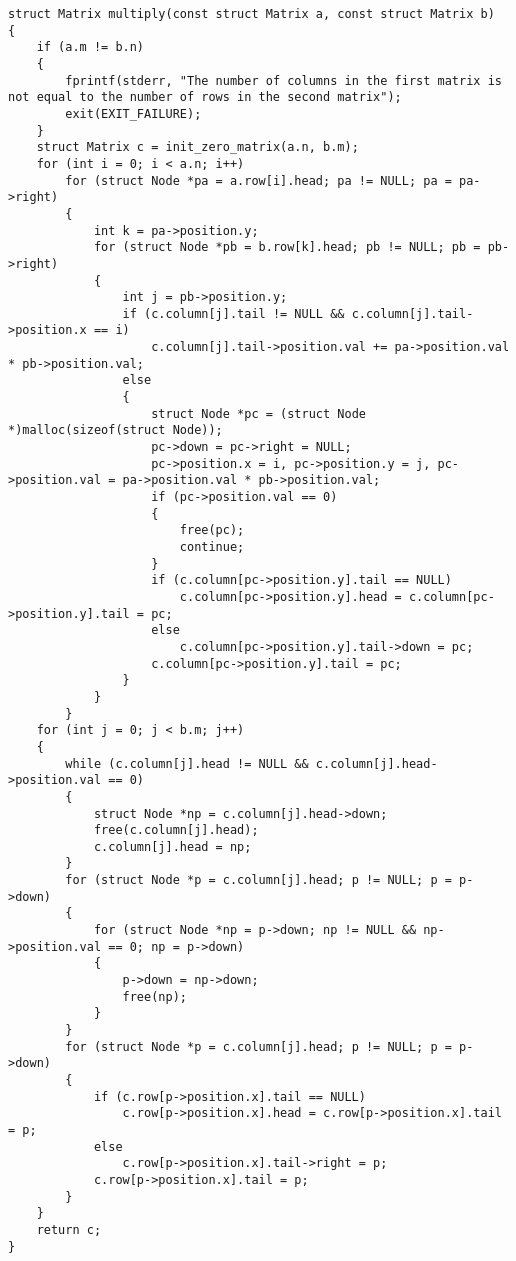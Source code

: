 \documentclass[12pt]{article}
\begin{document}
{\begin{lstlisting}
struct Matrix multiply(const struct Matrix a, const struct Matrix b)
{
    if (a.m != b.n)
    {
        fprintf(stderr, "The number of columns in the first matrix is not equal to the number of rows in the second matrix");
        exit(EXIT_FAILURE);
    }
    struct Matrix c = init_zero_matrix(a.n, b.m);
    for (int i = 0; i < a.n; i++)
        for (struct Node *pa = a.row[i].head; pa != NULL; pa = pa->right)
        {
            int k = pa->position.y;
            for (struct Node *pb = b.row[k].head; pb != NULL; pb = pb->right)
            {
                int j = pb->position.y;
                if (c.column[j].tail != NULL && c.column[j].tail->position.x == i)
                    c.column[j].tail->position.val += pa->position.val * pb->position.val;
                else
                {
                    struct Node *pc = (struct Node *)malloc(sizeof(struct Node));
                    pc->down = pc->right = NULL;
                    pc->position.x = i, pc->position.y = j, pc->position.val = pa->position.val * pb->position.val;
                    if (pc->position.val == 0)
                    {
                        free(pc);
                        continue;
                    }
                    if (c.column[pc->position.y].tail == NULL)
                        c.column[pc->position.y].head = c.column[pc->position.y].tail = pc;
                    else
                        c.column[pc->position.y].tail->down = pc;
                    c.column[pc->position.y].tail = pc;
                }
            }
        }
    for (int j = 0; j < b.m; j++)
    {
        while (c.column[j].head != NULL && c.column[j].head->position.val == 0)
        {
            struct Node *np = c.column[j].head->down;
            free(c.column[j].head);
            c.column[j].head = np;
        }
        for (struct Node *p = c.column[j].head; p != NULL; p = p->down)
        {
            for (struct Node *np = p->down; np != NULL && np->position.val == 0; np = p->down)
            {
                p->down = np->down;
                free(np);
            }
        }
        for (struct Node *p = c.column[j].head; p != NULL; p = p->down)
        {
            if (c.row[p->position.x].tail == NULL)
                c.row[p->position.x].head = c.row[p->position.x].tail = p;
            else
                c.row[p->position.x].tail->right = p;
            c.row[p->position.x].tail = p;
        }
    }
    return c;
}


\end{lstlisting}}
\end{document}
